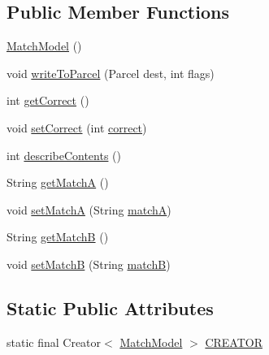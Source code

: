 \subsection*{Public Member Functions}
\begin{DoxyCompactItemize}
\item 
\hyperlink{classorg_1_1buildmlearn_1_1toolkit_1_1matchtemplate_1_1data_1_1MatchModel_ae44d04a4b0bbdfedafd20fe01583fe9c}{Match\+Model} ()
\item 
void \hyperlink{classorg_1_1buildmlearn_1_1toolkit_1_1matchtemplate_1_1data_1_1MatchModel_a94acfbb451850071593197d6404f99b9}{write\+To\+Parcel} (Parcel dest, int flags)
\item 
int \hyperlink{classorg_1_1buildmlearn_1_1toolkit_1_1matchtemplate_1_1data_1_1MatchModel_aff8cdbb14416ed208b762e6eb34ddb94}{get\+Correct} ()
\item 
void \hyperlink{classorg_1_1buildmlearn_1_1toolkit_1_1matchtemplate_1_1data_1_1MatchModel_ab918d88110b1187f677036c25d96f264}{set\+Correct} (int \hyperlink{classorg_1_1buildmlearn_1_1toolkit_1_1matchtemplate_1_1data_1_1MatchModel_acf82e342f9003f3b513d75de5461670a}{correct})
\item 
int \hyperlink{classorg_1_1buildmlearn_1_1toolkit_1_1matchtemplate_1_1data_1_1MatchModel_ae2f3162e873189aa6aad04c951923a41}{describe\+Contents} ()
\item 
String \hyperlink{classorg_1_1buildmlearn_1_1toolkit_1_1matchtemplate_1_1data_1_1MatchModel_a1768bbea871e089a51fc23bf09262980}{get\+MatchA} ()
\item 
void \hyperlink{classorg_1_1buildmlearn_1_1toolkit_1_1matchtemplate_1_1data_1_1MatchModel_a0bedf717585583062728c9c70a1b82ee}{set\+MatchA} (String \hyperlink{classorg_1_1buildmlearn_1_1toolkit_1_1matchtemplate_1_1data_1_1MatchModel_a479c6e7b7bbab00213072a02ad3a4893}{matchA})
\item 
String \hyperlink{classorg_1_1buildmlearn_1_1toolkit_1_1matchtemplate_1_1data_1_1MatchModel_a0929db77c1206f535152b39ba6d359c0}{get\+MatchB} ()
\item 
void \hyperlink{classorg_1_1buildmlearn_1_1toolkit_1_1matchtemplate_1_1data_1_1MatchModel_aaceb21a6da1a605e500b594ad6f1fa2e}{set\+MatchB} (String \hyperlink{classorg_1_1buildmlearn_1_1toolkit_1_1matchtemplate_1_1data_1_1MatchModel_a94424270b35968f4b95514d22c157716}{matchB})
\end{DoxyCompactItemize}
\subsection*{Static Public Attributes}
\begin{DoxyCompactItemize}
\item 
static final Creator$<$ \hyperlink{classorg_1_1buildmlearn_1_1toolkit_1_1matchtemplate_1_1data_1_1MatchModel}{Match\+Model} $>$ \hyperlink{classorg_1_1buildmlearn_1_1toolkit_1_1matchtemplate_1_1data_1_1MatchModel_a4c528ce7610a239f61a99d7d24d97a7b}{C\+R\+E\+A\+T\+OR}
\end{DoxyCompactItemize}
